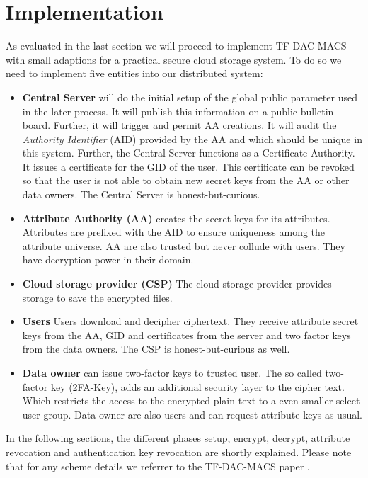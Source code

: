 \chapter{Implementation}
As evaluated in the last section we will proceed to implement TF-DAC-MACS with small adaptions for a practical secure cloud storage system. To do so we need to implement five entities into our distributed system:  

\begin{itemize}
  \item \textbf{Central Server} will do the initial setup of the global public parameter used in the later process. It will publish this information on a public bulletin board. Further, it will trigger and permit AA creations. It will audit the \textit{Authority Identifier} (\ac{AID}) provided by the AA and which should be unique in this system. 
Further, the Central Server functions as a Certificate Authority. It issues a certificate for the GID of the user. This certificate can be revoked so that the user is not able to obtain new secret keys from the AA or other data owners. The Central Server is honest-but-curious.
  \item \textbf{Attribute Authority (\ac{AA})} creates the secret keys for its attributes. Attributes are prefixed with the \ac{AID} to ensure uniqueness among the attribute universe. AA are also trusted but never collude with users. They have decryption power in their domain. 
  \item \textbf{Cloud storage provider (\ac{CSP})} The cloud storage provider provides storage to save the encrypted files.
  \item \textbf{Users} Users download and decipher ciphertext. They receive attribute secret keys from the AA, GID and certificates from the server and two factor keys from the data owners. The CSP is honest-but-curious as well.
  \item \textbf{Data owner} can issue two-factor keys to trusted user. The so called two-factor key (\ac{2FA}-Key), adds an additional security layer to the cipher text. Which restricts the access to the encrypted plain text to a even smaller select user group. Data owner are also users and can request attribute keys as usual. 
\end{itemize}

In the following sections, the different phases setup, encrypt, decrypt, attribute revocation and authentication key revocation are shortly explained. Please note that for any scheme details we referrer to the TF-DAC-MACS \cite{li2017two} paper .


